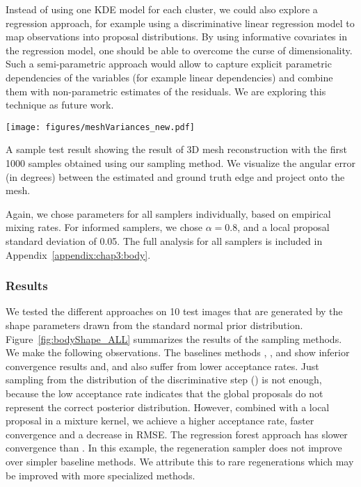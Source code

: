 Instead of using one KDE model for each cluster, we could also
explore a regression approach, for example using a
discriminative linear regression model to map observations into
proposal distributions. By using informative covariates in the
regression model, one should be able to overcome the curse of
dimensionality. Such a semi-parametric approach would allow to capture
explicit parametric dependencies of the variables (for example linear
dependencies) and combine them with non-parametric estimates of the
residuals. We are exploring this technique as future work.

\begin{figure*}[t]
\begin{center}
\centerline{\texttt{[image: figures/meshVariances\_new.pdf]}}
  {A sample test result showing the result of 3D mesh
  reconstruction with the first 1000 samples obtained using our
  \MIXLMH sampling method. We visualize the angular error (in degrees) between the
  estimated and ground truth edge and project onto the mesh.}
\label{fig:meshVariances}
\end{center}
\end{figure*}

Again, we chose parameters for all samplers individually, based on
empirical mixing rates. For informed samplers, we chose $\alpha = 0.8$,
and a local proposal standard deviation of 0.05. The full analysis for all
samplers is included in Appendix~\ref{appendix:chap3:body}.


\subsubsection{Results}
\label{sec:bodyresults}

We tested the different approaches on 10 test images that are
generated by the shape parameters drawn from the standard normal prior
distribution. Figure~\ref{fig:bodyShape_ALL} summarizes the results of the
sampling methods. We make the following observations. The baselines
methods \MH, \MHWG, and \PT show inferior convergence results and, \MH and
\PT also suffer from lower acceptance rates. Just sampling from
the distribution of the discriminative step (\INDLMH) is not enough,
because the low acceptance rate indicates that the global proposals do not represent the
correct posterior distribution. However, combined with a local
proposal in a mixture kernel, we achieve a higher acceptance rate, faster convergence
and a decrease in RMSE. The regression forest approach has slower
convergence than \MIXLMH. In this example, the regeneration sampler
\REGMH does not improve over simpler baseline methods. We attribute
this to rare regenerations which may be improved with more specialized
methods.

